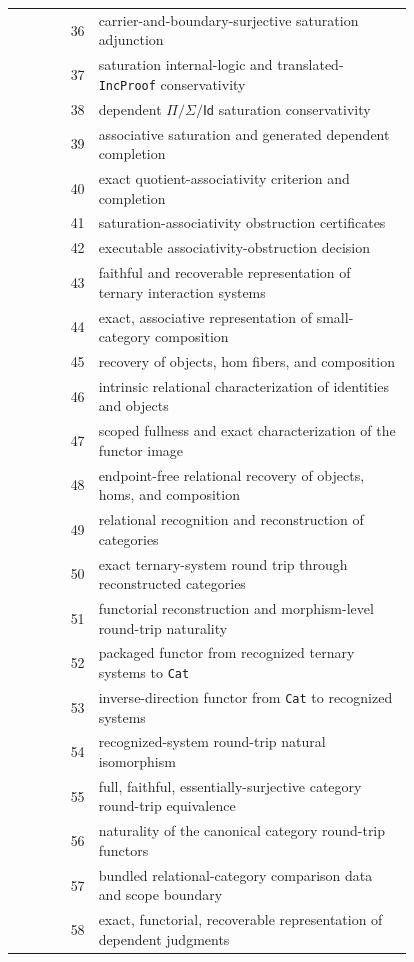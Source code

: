 \documentclass[11pt]{article}
\theoremstyle{definition}
\begin{document}
\begin{center}\scriptsize
\begin{tabular}{@{}r p{0.79\linewidth}@{}}
\toprule
36 & carrier-and-boundary-surjective saturation adjunction \\
37 & saturation internal-logic and translated-\texttt{IncProof} conservativity \\
38 & dependent $\Pi/\Sigma/\mathsf{Id}$ saturation conservativity \\
39 & associative saturation and generated dependent completion \\
40 & exact quotient-associativity criterion and completion \\
41 & saturation-associativity obstruction certificates \\
42 & executable associativity-obstruction decision \\
43 & faithful and recoverable representation of ternary interaction systems \\
44 & exact, associative representation of small-category composition \\
45 & recovery of objects, hom fibers, and composition \\
46 & intrinsic relational characterization of identities and objects \\
47 & scoped fullness and exact characterization of the functor image \\
48 & endpoint-free relational recovery of objects, homs, and composition \\
49 & relational recognition and reconstruction of categories \\
50 & exact ternary-system round trip through reconstructed categories \\
51 & functorial reconstruction and morphism-level round-trip naturality \\
52 & packaged functor from recognized ternary systems to \texttt{Cat} \\
53 & inverse-direction functor from \texttt{Cat} to recognized systems \\
54 & recognized-system round-trip natural isomorphism \\
55 & full, faithful, essentially-surjective category round-trip equivalence \\
56 & naturality of the canonical category round-trip functors \\
57 & bundled relational-category comparison data and scope boundary \\
58 & exact, functorial, recoverable representation of dependent judgments \\

\end{tabular}
\end{center}
\end{document}
